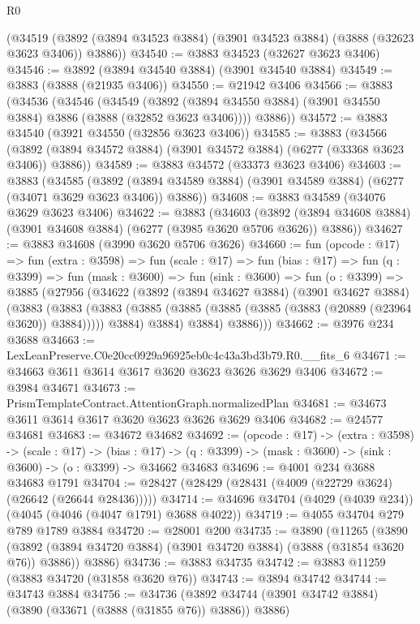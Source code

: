 \begin{lexlean}{R0}
\begin{coremodule}
    (@34519 (@3892 (@3894 @34523 @3884) (@3901 @34523 @3884) (@3888 (@32623 @3623 @3406)) @3886))
@34540 := @3883 @34523 (@32627 @3623 @3406)
@34546 := @3892 (@3894 @34540 @3884) (@3901 @34540 @3884)
@34549 := @3883 (@3888 (@21935 @3406))
@34550 := @21942 @3406
@34566 := @3883
    (@34536
      (@34546
        (@34549
          (@3892 (@3894 @34550 @3884) (@3901 @34550 @3884) @3886 (@3888 (@32852 @3623 @3406))))
        @3886))
@34572 := @3883 @34540 (@3921 @34550 (@32856 @3623 @3406))
@34585 := @3883
    (@34566 (@3892 (@3894 @34572 @3884) (@3901 @34572 @3884) (@6277 (@33368 @3623 @3406)) @3886))
@34589 := @3883 @34572 (@33373 @3623 @3406)
@34603 := @3883
    (@34585
      (@3892 (@3894 @34589 @3884) (@3901 @34589 @3884) (@6277 (@34071 @3629 @3623 @3406)) @3886))
@34608 := @3883 @34589 (@34076 @3629 @3623 @3406)
@34622 := @3883
    (@34603
      (@3892 (@3894 @34608 @3884) (@3901 @34608 @3884) (@6277 (@3985 @3620 @5706 @3626)) @3886))
@34627 := @3883 @34608 (@3990 @3620 @5706 @3626)
@34660 := fun (opcode : @17) =>
  fun (extra : @3598) =>
  fun (scale : @17) =>
  fun (bias : @17) =>
  fun (q : @3399) =>
  fun (mask : @3600) =>
  fun (sink : @3600) =>
  fun (o : @3399) =>
  @3885
    (@27956
      (@34622
        (@3892
          (@3894 @34627 @3884)
          (@3901 @34627 @3884)
          (@3883
            (@3883
              (@3883 (@3885 (@3885 (@3885 (@3885 (@3883 (@20889 (@23964 @3620)) @3884))))) @3884)
              @3884)
            @3884)
          @3886)))
@34662 := @3976 @234 @3688
@34663 := LexLeanPreserve.C0e20cc0929a96925eb0c4c43a3bd3b79.R0.__fits_6
@34671 := @34663 @3611 @3614 @3617 @3620 @3623 @3626 @3629 @3406
@34672 := @3984 @34671
@34673 := PrismTemplateContract.AttentionGraph.normalizedPlan
@34681 := @34673 @3611 @3614 @3617 @3620 @3623 @3626 @3629 @3406
@34682 := @24577 @34681
@34683 := @34672 @34682
@34692 := (opcode : @17) ->
  (extra : @3598) ->
  (scale : @17) ->
  (bias : @17) -> (q : @3399) -> (mask : @3600) -> (sink : @3600) -> (o : @3399) -> @34662 @34683
@34696 := @4001 @234 @3688 @34683 @1791
@34704 := @28427 (@28429 (@28431 (@4009 (@22729 @3624) (@26642 (@26644 @28436)))))
@34714 := @34696 @34704 (@4029 (@4039 @234)) (@4045 (@4046 (@4047 @1791) @3688 @4022))
@34719 := @4055 @34704 @279 @789 @1789 @3884
@34720 := @28001 @200
@34735 := @3890
    (@11265
      (@3890 (@3892 (@3894 @34720 @3884) (@3901 @34720 @3884) (@3888 (@31854 @3620 @76)) @3886))
      @3886)
@34736 := @3883 @34735
@34742 := @3883 @11259 (@3883 @34720 (@31858 @3620 @76))
@34743 := @3894 @34742
@34744 := @34743 @3884
@34756 := @34736
    (@3892 @34744 (@3901 @34742 @3884) (@3890 (@33671 (@3888 (@31855 @76)) @3886)) @3886)

\end{coremodule}
\end{lexlean}
